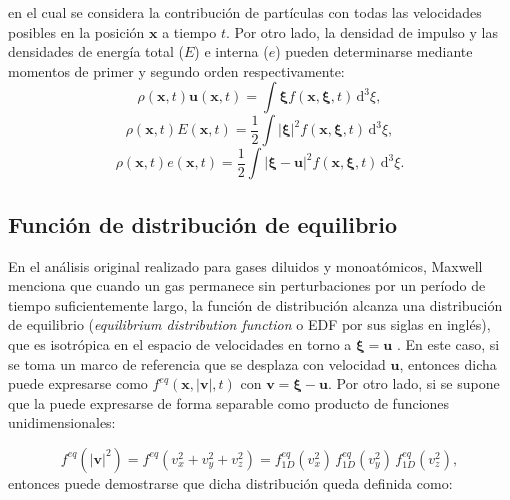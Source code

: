 en el cual se considera la contribuci\'on de part\'iculas con todas las velocidades posibles en la posici\'on $\bm{x}$ a tiempo $t$. Por otro lado, la densidad de impulso y las densidades de energ\'ia total ($E$) e interna ($e$) pueden determinarse mediante momentos de primer y segundo orden respectivamente:
\begin{equation}
	\rho(\bm{x},t) \bm{u}(\bm{x},t) = \int \bm{\xi} f(\bm{x},\bm{\xi},t) \, \mbox{d}^3 \xi,
\end{equation}
\begin{equation}
	\rho(\bm{x},t) E(\bm{x},t) = \dfrac{1}{2} \int |\bm{\xi}|^2 f(\bm{x},\bm{\xi},t) \, \mbox{d}^3 \xi,
\end{equation}
\begin{equation}
	\rho(\bm{x},t) e(\bm{x},t) = \dfrac{1}{2} \int |\bm{\xi}-\bm{u}|^2 f(\bm{x},\bm{\xi},t) \, \mbox{d}^3 \xi.
\end{equation}


\subsection{Funci\'on de distribuci\'on de equilibrio}
En el an\'alisis original realizado para gases diluidos y monoat\'omicos, Maxwell menciona que cuando un gas permanece sin perturbaciones por un per\'iodo de tiempo suficientemente largo, la funci\'on de distribuci\'on \fvar{} alcanza una distribuci\'on de equilibrio \feqvar{} (\emph{equilibrium distribution function} o EDF por sus siglas en ingl\'es), que es isotr\'opica en el espacio de velocidades en torno a $\bm{\xi} = \bm{u}$ \cite{chapman_mathematical_1970}. En este caso, si se toma un marco de referencia que se desplaza con velocidad $\bm{u}$, entonces dicha \edf{} puede expresarse como $f^{eq}(\bm{x},|\bm{v}|,t)$ con $\bm{v}=\bm{\xi}-\bm{u}$. Por otro lado, si se supone que la \edf{} puede expresarse de forma separable como producto de funciones unidimensionales:

\begin{equation}
	f^{eq}(|\bm{v}|^2) = f^{eq}(v_x^2 + v_y^2 + v_z^2)=f_{1D}^{eq}(v_x^2) \, f_{1D}^{eq}(v_y^2) \, f_{1D}^{eq}(v_z^2),
\end{equation}
entonces puede demostrarse que dicha distribuci\'on queda definida como:

